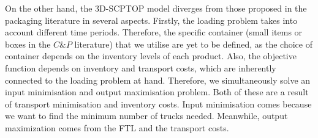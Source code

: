 On the other hand, the 3D-SCPTOP model diverges from those proposed in the packaging literature in several aspects. Firstly, the loading problem takes into account different time periods. Therefore, the specific container (small items or boxes in the $C\&P$ literature) that we utilise are yet to be defined, as the choice of container depends on the inventory levels of each product.
Also, the objective function depends on inventory and transport costs, which are inherently connected to the loading problem at hand. Therefore, we simultaneously solve an input minimisation  and output maximisation problem. Both of these are a result of transport minimisation and inventory costs. Input minimisation comes because we want to find the minimum number of trucks needed. Meanwhile, output maximization comes from the FTL and the transport costs.

